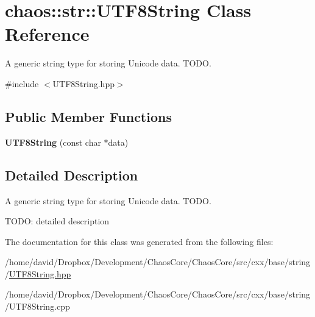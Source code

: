 \hypertarget{classchaos_1_1str_1_1_u_t_f8_string}{\section{chaos\-:\-:str\-:\-:U\-T\-F8\-String Class Reference}
\label{classchaos_1_1str_1_1_u_t_f8_string}
}


A generic string type for storing Unicode data. T\-O\-D\-O.  




{\ttfamily \#include $<$U\-T\-F8\-String.\-hpp$>$}

\subsection*{Public Member Functions}
\begin{DoxyCompactItemize}
\item 
\hypertarget{classchaos_1_1str_1_1_u_t_f8_string_af506696bfe777057c4a7e6b6acf19dab}{{\bfseries U\-T\-F8\-String} (const char $\ast$data)}\label{classchaos_1_1str_1_1_u_t_f8_string_af506696bfe777057c4a7e6b6acf19dab}

\end{DoxyCompactItemize}


\subsection{Detailed Description}
A generic string type for storing Unicode data. T\-O\-D\-O. 

T\-O\-D\-O\-: detailed description 

The documentation for this class was generated from the following files\-:\begin{DoxyCompactItemize}
\item 
/home/david/\-Dropbox/\-Development/\-Chaos\-Core/\-Chaos\-Core/src/cxx/base/string/\hyperlink{_u_t_f8_string_8hpp}{U\-T\-F8\-String.\-hpp}\item 
/home/david/\-Dropbox/\-Development/\-Chaos\-Core/\-Chaos\-Core/src/cxx/base/string/U\-T\-F8\-String.\-cpp\end{DoxyCompactItemize}
